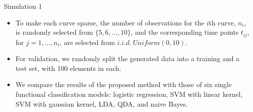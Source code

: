 \documentclass{beamer}
\begin{document}
\begin{frame}{Simulation 1}
	\begin{itemize}
		\item{
			To make each curve sparse, the number of observations for the $i$th curve, $n_i$, is randomly selected from $\{5, 6, \ldots, 10\}$, and the corresponding time points $t_{ij}$, for $j=1, \dots, n_i$, are selected from $i.i.d. \ Uniform(0, 10)$.
		}
		\item{
			For validation, we randomly split the generated data into a training and a test set, with 100 elements in each.
		}
		\item{
			We compare the results of the proposed method with those of six single functional classification models: logistic regression, SVM with linear kernel, SVM with gaussian kernel, LDA, QDA, and naive Bayes.
		}
	\end{itemize}
\end{frame}
\end{document}
